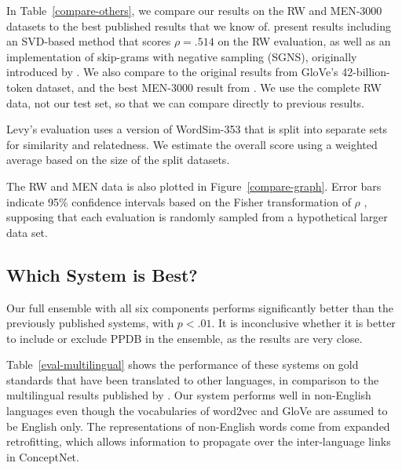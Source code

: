 \documentclass[11pt,letterpaper]{article}
\begin{document}
In Table~\ref{compare-others}, we compare our results on the RW and MEN-3000
datasets to the best published results that we know of.
 present results including an SVD-based method that
scores $\rho = .514$ on the RW evaluation, as well as an implementation of
skip-grams with negative sampling (SGNS), originally introduced by
. We also compare to the original results from
GloVe's 42-billion-token dataset, and the best MEN-3000 result from
. We use the complete RW data, not our test
set, so that we can compare directly to previous results.

Levy's evaluation uses a version of WordSim-353 that is split into separate
sets for similarity and relatedness. We estimate the overall score using a
weighted average based on the size of the split datasets.

The RW and MEN data is also plotted in Figure~\ref{compare-graph}. Error bars
indicate 95\% confidence intervals based on the Fisher transformation of $\rho$
\cite{fisher1915frequency}, supposing that each evaluation is randomly sampled
from a hypothetical larger data set.

\subsection{Which System is Best?}

Our full ensemble with all six components performs significantly better
than the previously published systems, with $p < .01$. It is inconclusive
whether it is better to include or exclude PPDB in the ensemble, as the results
are very close.

Table~\ref{eval-multilingual} shows the performance of these systems on
gold standards that have been translated to other languages, in comparison to
the multilingual results published by . Our
system performs well in non-English languages even though the vocabularies of
word2vec and GloVe are assumed to be English only. The representations of
non-English words come from expanded retrofitting, which allows information to
propagate over the inter-language links in ConceptNet.


\end{document}
